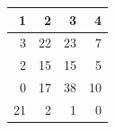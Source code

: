 \begin{tabular}{rrrr}
\toprule
1 & 2 & 3 & 4 \\
\midrule
3 & 22 & 23 & 7 \\
2 & 15 & 15 & 5 \\
0 & 17 & 38 & 10 \\
21 & 2 & 1 & 0 \\
\bottomrule
\end{tabular}
